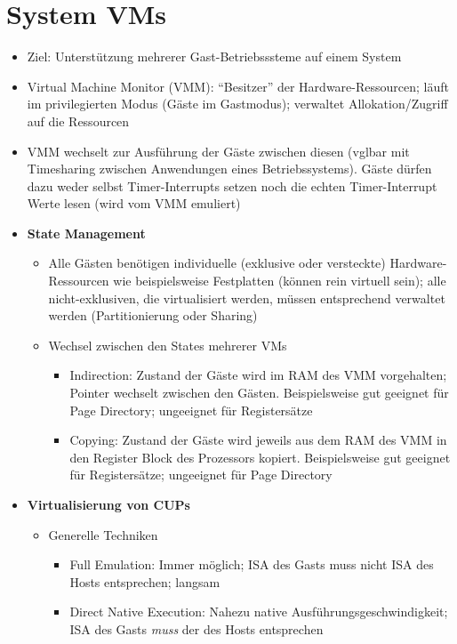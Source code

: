 \section{System VMs}
\begin{itemize}
	\item Ziel: Unterstützung mehrerer Gast-Betriebsssteme auf einem System
	\item Virtual Machine Monitor (VMM): "`Besitzer"' der Hardware-Ressourcen; läuft im privilegierten Modus (Gäste im Gastmodus); verwaltet Allokation/Zugriff auf die Ressourcen
	\item VMM wechselt zur Ausführung der Gäste zwischen diesen (vglbar mit Timesharing zwischen Anwendungen eines Betriebssystems). Gäste dürfen dazu weder selbst Timer-Interrupts setzen noch die echten Timer-Interrupt Werte lesen (wird vom VMM emuliert) %
	\item \textbf{State Management}
	\begin{itemize}
		\item Alle Gästen benötigen individuelle (exklusive oder versteckte) Hardware-Ressourcen wie beispielsweise Festplatten (können rein virtuell sein); alle nicht-exklusiven, die virtualisiert werden, müssen entsprechend verwaltet werden (Partitionierung oder Sharing)
		\item Wechsel zwischen den States mehrerer VMs
		\begin{itemize}
			\item Indirection: Zustand der Gäste wird im RAM des VMM vorgehalten; Pointer wechselt zwischen den Gästen. Beispielsweise gut geeignet für Page Directory; ungeeignet für Registersätze %
			\item Copying: Zustand der Gäste wird jeweils aus dem RAM des VMM in den Register Block des Prozessors kopiert. Beispielsweise gut geeignet für Registersätze; ungeeignet für Page Directory
		\end{itemize}
	\end{itemize}
	\item \textbf{Virtualisierung von CUPs}
	\begin{itemize}
		\item Generelle Techniken
		\begin{itemize}
			\item Full Emulation: Immer möglich; ISA des Gasts muss nicht ISA des Hosts entsprechen; langsam
			\item Direct Native Execution: Nahezu native Ausführungsgeschwindigkeit; ISA des Gasts \textit{muss} der des Hosts entsprechen

\end{itemize}
\end{itemize}
\end{itemize}
